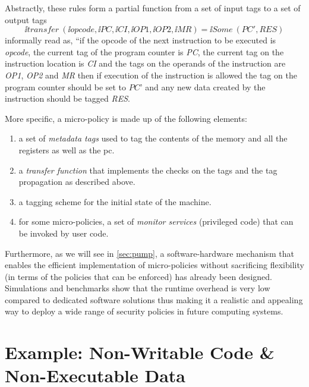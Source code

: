 Abstractly, these rules form a partial function from a set of
input tags to a set of output tags
$$\ii{transfer}~(\ii{opcode}, \ii{PC}, \ii{CI}, \ii{OP1}, \ii{OP2},\ii{MR}) = \ii{Some}~(PC',RES)$$
informally read as, ``if the opcode of the next instruction to be executed is
\textit{opcode}, the current tag of the program counter is \textit{PC}, the current tag
on the instruction location is \textit{CI} and the tags on the operands of the
instruction are \textit{OP1}, \textit{OP2} and \textit{MR} then if execution of the instruction
is allowed the tag on the program counter should be set to $\textit{PC'}$ and any
new data created by the instruction should be tagged \textit{RES}.

More specific, a micro-policy is made up of the following elements:
\begin{enumerate}
\item a set of {\em metadata tags} used to tag the contents of the memory and
all the registers as well as the pc.
\item a {\em transfer function} that implements the checks on the tags and
the tag propagation as described above.
\item a tagging scheme for the initial state of the machine.
\item for some micro-policies, a set of {\em monitor services} (\IE privileged
code) that can be invoked by user code.
\end{enumerate}

Furthermore, as we will see in \cref{sec:pump}, a software-hardware
mechanism that enables the efficient implementation of micro-policies
without sacrificing flexibility (in terms of the policies that can be
enforced) has already been designed. Simulations and benchmarks show
that the runtime overhead is very low compared to dedicated software
solutions thus making it a realistic and appealing way to deploy a
wide range of security policies in future computing systems.

\section{Example:
  Non-Writable Code \& Non-Executable Data}
\label{sec:nwc_nxd}



